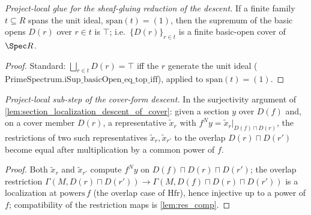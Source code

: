 \begin{lemma}

  \label{lem:iSup_basicOpen_subtype_eq_top}
  \textit{Project-local glue for the sheaf-gluing reduction of the descent.}
  If a finite family \(t \subseteq R\) spans the unit ideal, \(\mathrm{span}(t) = (1)\), then the
  supremum of the basic opens \(D(r)\) over \(r \in t\) is \(\top\); i.e.\ \(\{D(r)\}_{r \in t}\) is a
  finite basic-open cover of \(\Spec R\).
\end{lemma}
\begin{proof}
  Standard: \(\bigsqcup_{r \in t} D(r) = \top\) iff the \(r\) generate the unit ideal
  (\(\mathrm{PrimeSpectrum.iSup\_basicOpen\_eq\_top\_iff}\)), applied to \(\mathrm{span}(t) = (1)\).
\end{proof}

\begin{lemma}

  \label{lem:descent_overlap_agree}
  \textit{Project-local sub-step of the cover-form descent.}
  In the surjectivity argument of \cref{lem:section_localization_descent_of_cover}: given a section
  \(y\) over \(D(f)\) and, on a cover member \(D(r)\), a representative \(\tilde x_r\) with
  \(f^N y = \tilde x_r|_{D(f)\sqcap D(r)}\), the restrictions of two such representatives
  \(\tilde x_r, \tilde x_{r'}\) to the overlap \(D(r) \sqcap D(r')\) become equal after multiplication
  by a common power of \(f\).
\end{lemma}
\begin{proof}
  Both \(\tilde x_r\) and \(\tilde x_{r'}\) compute \(f^N y\) on \(D(f) \sqcap D(r) \sqcap D(r')\); the
  overlap restriction \(\Gamma(M, D(r)\sqcap D(r')) \to \Gamma(M, D(f) \sqcap D(r) \sqcap D(r'))\) is a
  localization at \(\mathrm{powers}\,f\) (the overlap case of \(\mathrm{Hfr}\)), hence injective up to a
  power of \(f\); compatibility of the restriction maps is \cref{lem:res_comp}.
\end{proof}

